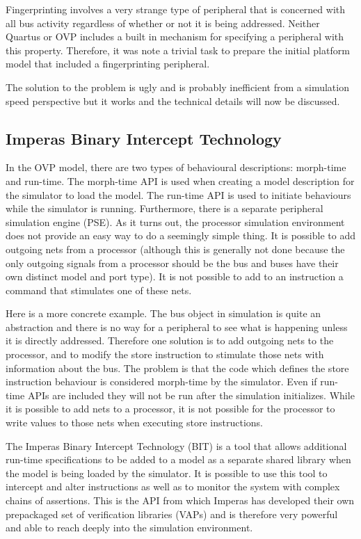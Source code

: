 Fingerprinting involves a very strange type of peripheral that is concerned with all bus activity regardless of whether or not it is being addressed. Neither Quartus or OVP includes a built in mechanism for specifying a peripheral with this property. Therefore, it was note a trivial task to prepare the initial platform model that included a fingerprinting peripheral. 

The solution to the problem is ugly and is probably inefficient from a simulation speed perspective but it works and the technical details will now be discussed.

\subsection{Imperas Binary Intercept Technology}

In the OVP model, there are two types of behavioural descriptions: morph-time and run-time. The morph-time  API is used when creating a model description for the simulator to load the model. The run-time API is used to initiate behaviours while the simulator is running. Furthermore, there is a separate peripheral simulation engine (PSE). As it turns out, the processor simulation environment does not provide an easy way to do a seemingly simple thing. It is possible to add outgoing nets from a processor (although this is generally not done because the only outgoing signals from a processor should be the bus and buses have their own distinct model and port type). It is not possible to add to an instruction a command that stimulates one of these nets. 

Here is a more concrete example. The bus object in simulation is quite an abstraction and there is no way for a peripheral to see what is happening unless it is directly addressed. Therefore one solution is to add outgoing nets to the processor, and to modify the store instruction to stimulate those nets with information about the bus. The problem is that the code which defines the store instruction behaviour is considered morph-time by the simulator. Even if run-time APIs are included they will not be run after the simulation initializes. While it is possible to add nets to a processor, it is not possible for the processor to write values to those nets when executing store instructions. 

The Imperas Binary Intercept Technology (BIT) is a tool that allows additional run-time specifications to be added to a model as a separate shared library when the model is being loaded by the simulator. It is possible to use this tool to intercept and alter instructions as well as to monitor the system with complex chains of assertions. This is the API from which Imperas has developed their own prepackaged set of verification libraries (VAPs) and is therefore very powerful and able to reach deeply into the simulation environment.

